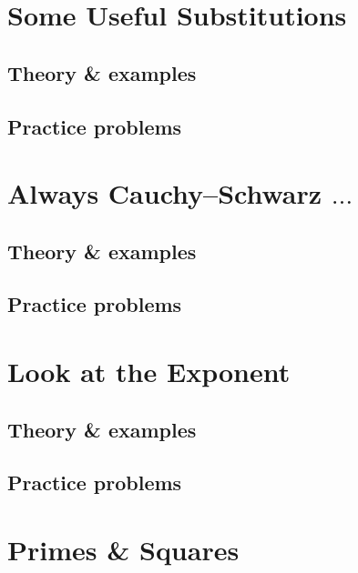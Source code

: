 \documentclass[oneside]{book}
\numberwithin{equation}{section}
\begin{document}

\section{Some Useful Substitutions}

\subsection{Theory \& examples}

\subsection{Practice problems}


\section{Always Cauchy--Schwarz $\ldots$}

\subsection{Theory \& examples}

\subsection{Practice problems}


\section{Look at the Exponent}

\subsection{Theory \& examples}

\subsection{Practice problems}


\section{Primes \& Squares}
\end{document}
